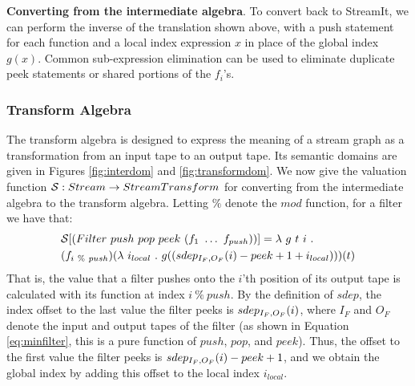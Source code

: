 {\bf Converting from the intermediate algebra}.  To convert back to
StreamIt, we can perform the inverse of the translation shown above,
with a push statement for each function and a local index expression
$x$ in place of the global index $g(x)$.  Common sub-expression
elimination can be used to eliminate duplicate peek statements or
shared portions of the $f_i$'s.

\subsubsection{Transform Algebra}

The transform algebra is designed to express the meaning of a stream
graph as a transformation from an input tape to an output tape.  Its
semantic domains are given in Figures \ref{fig:interdom} and
\ref{fig:transformdom}.  We now give the valuation function ${\cal S}:
Stream \ra StreamTransform$ for converting from the intermediate
algebra to the transform algebra.  Letting $\%$ denote the $mod$
function, for a filter we have that:
\begin{align*}
&{\cal S} [(Filter~push~pop~peek~(f_1~\dots~f_{push}))] =
  \la~g~t~i~.~\\ &(f_{i~\%~push})(\la~i_{local}~.~g((\mi{I_F}{O_F}(i) - peek + 1 + i_{local})))(t)
\end{align*}
That is, the value that a filter pushes onto the $i$'th position of its
output tape is calculated with its function at index $i~\%~push$.  By
the definition of $sdep$, the index offset to the last value the filter
peeks is $sdep_{I_F, O_F}(i)$, where $I_F$ and $O_F$ denote the input and
output tapes of the filter (as shown in Equation \ref{eq:minfilter},
this is a pure function of $push$, $pop$, and $peek$).  Thus, the offset
to the first value the filter peeks is $sdep_{I_F, O_F}(i) - peek + 1$,
and we obtain the global index by adding this offset to the local index
$i_{local}$.

